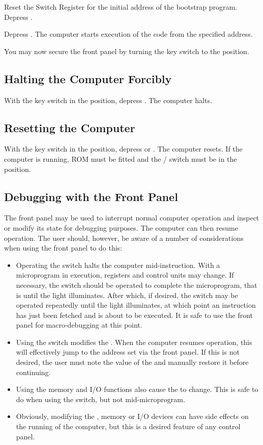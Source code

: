 Reset the Switch Register for the initial address of the bootstrap
program. Depress .

Depress . The computer starts execution of the code from the
specified address.

You may now secure the front panel by turning the key switch to the
 position.

\subsection{Halting the Computer Forcibly}

With the key switch in the  position, depress . The
computer halts.

\subsection{Resetting the Computer}

With the key switch in the  position, depress  or
. The computer resets. If the computer is running, ROM must
be fitted and the / switch must be in the
 position.

\subsection{Debugging with the Front Panel}

The front panel may be used to interrupt normal computer operation and
inspect or modify its state for debugging purposes. The computer can
then resume operation. The user should, however, be aware of a number
of considerations when using the front panel to do this:

\begin{itemize}
\item Operating the  switch halts the computer
  mid-instruction. With a microprogram in execution, registers and
  control units may change. If necessary, the  switch should
  be operated to complete the microprogram, that is until the
   light illuminates. After which, if desired, the
   switch may be operated repeatedly until the 
  light illuminates, at which point an instruction has just been
  fetched and is about to be executed. It is safe to use the front
  panel for macro-debugging at this point.
\item Using the  switch modifies the \PC. When the
  computer resumes operation, this will effectively jump to the
  address set via the front panel. If this is not desired, the user
  must note the value of the \PC and manually restore it before
  continuing.
\item Using the memory and I/O functions also cause the \MAR{} to
  change. This is safe to do when using the  switch, but not
  mid-microprogram.
\item Obviously, modifying the \IR{}, memory or I/O devices can have
  side effects on the running of the computer, but this is a desired
  feature of any control panel.
\end{itemize}


